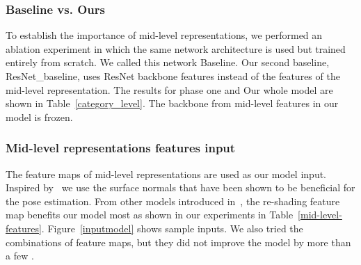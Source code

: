 \documentclass[letterpaper, 10 pt, conference]{ieeeconf}  \pdfoutput=1
\begin{document}
\subsubsection{Baseline vs. Ours}
To establish the importance of mid-level representations, we performed an ablation experiment in which the same network architecture is used but trained entirely from scratch. We called this network Baseline. Our second baseline, ResNet\_baseline, uses ResNet backbone features instead of the features of the mid-level representation. The results for phase one and Our whole model are shown in Table~\ref{category_level}. The backbone from mid-level features in our model is frozen. 




\begin{table}
\centering
{}
\caption{The choice of mid-level features and the effect on pose classification task with  bins with  overlap.}
\label{mid-level-features}
\end{table}


\subsubsection{Mid-level representations features input}
\label{mid_dif_input}
The  feature maps of mid-level representations are used as our model input. 
Inspired by~\cite{marrnet, pix3d} we use the surface normals that have been shown to be beneficial for the pose estimation. From other  models introduced in~\cite{taskonomy2018}, the re-shading feature map benefits our model most as shown in our experiments in Table~\ref{mid-level-features}. Figure~\ref{inputmodel} shows sample inputs. We also tried the combinations of  feature maps, but they did not improve the model by more than a few . 
\end{document}
